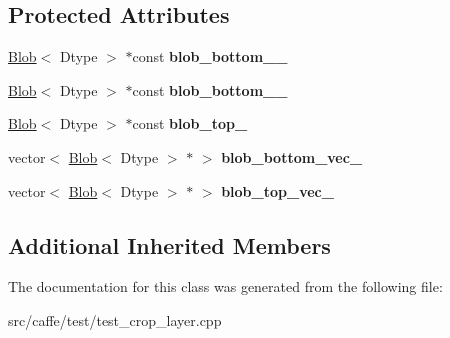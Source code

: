 \subsection*{Protected Attributes}
\begin{DoxyCompactItemize}
\item 
\mbox{\label{classcaffe_1_1_crop_layer_test_ac957f14b3f78c8d4597aa69ff4119543}} 
\mbox{\hyperlink{classcaffe_1_1_blob}{Blob}}$<$ Dtype $>$ $\ast$const {\bfseries blob\+\_\+bottom\+\_\+\_\+}
\item 
\mbox{\label{classcaffe_1_1_crop_layer_test_a20abab729c81a68145f622f061c81c29}} 
\mbox{\hyperlink{classcaffe_1_1_blob}{Blob}}$<$ Dtype $>$ $\ast$const {\bfseries blob\+\_\+bottom\+\_\+\_\+}
\item 
\mbox{\label{classcaffe_1_1_crop_layer_test_a2e4b3996aee9298d7895b764c36010bc}} 
\mbox{\hyperlink{classcaffe_1_1_blob}{Blob}}$<$ Dtype $>$ $\ast$const {\bfseries blob\+\_\+top\+\_\+}
\item 
\mbox{\label{classcaffe_1_1_crop_layer_test_ae6be2570c902f6bc74e781e2b100e18d}} 
vector$<$ \mbox{\hyperlink{classcaffe_1_1_blob}{Blob}}$<$ Dtype $>$ $\ast$ $>$ {\bfseries blob\+\_\+bottom\+\_\+vec\+\_\+}
\item 
\mbox{\label{classcaffe_1_1_crop_layer_test_aac78fd75f694e10161761bf303315e34}} 
vector$<$ \mbox{\hyperlink{classcaffe_1_1_blob}{Blob}}$<$ Dtype $>$ $\ast$ $>$ {\bfseries blob\+\_\+top\+\_\+vec\+\_\+}
\end{DoxyCompactItemize}
\subsection*{Additional Inherited Members}


The documentation for this class was generated from the following file\+:\begin{DoxyCompactItemize}
\item 
src/caffe/test/test\+\_\+crop\+\_\+layer.\+cpp\end{DoxyCompactItemize}
